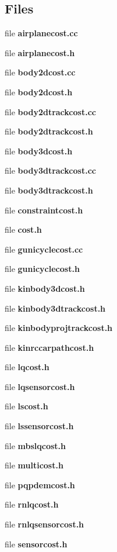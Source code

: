 \subsection*{\-Files}
\begin{DoxyCompactItemize}
\item 
file {\bf airplanecost.\-cc}
\item 
file {\bf airplanecost.\-h}
\item 
file {\bf body2dcost.\-cc}
\item 
file {\bf body2dcost.\-h}
\item 
file {\bf body2dtrackcost.\-cc}
\item 
file {\bf body2dtrackcost.\-h}
\item 
file {\bf body3dcost.\-h}
\item 
file {\bf body3dtrackcost.\-cc}
\item 
file {\bf body3dtrackcost.\-h}
\item 
file {\bf constraintcost.\-h}
\item 
file {\bf cost.\-h}
\item 
file {\bf gunicyclecost.\-cc}
\item 
file {\bf gunicyclecost.\-h}
\item 
file {\bf kinbody3dcost.\-h}
\item 
file {\bf kinbody3dtrackcost.\-h}
\item 
file {\bf kinbodyprojtrackcost.\-h}
\item 
file {\bf kinrccarpathcost.\-h}
\item 
file {\bf lqcost.\-h}
\item 
file {\bf lqsensorcost.\-h}
\item 
file {\bf lscost.\-h}
\item 
file {\bf lssensorcost.\-h}
\item 
file {\bf mbslqcost.\-h}
\item 
file {\bf multicost.\-h}
\item 
file {\bf pqpdemcost.\-h}
\item 
file {\bf rnlqcost.\-h}
\item 
file {\bf rnlqsensorcost.\-h}
\item 
file {\bf sensorcost.\-h}
\end{DoxyCompactItemize}
